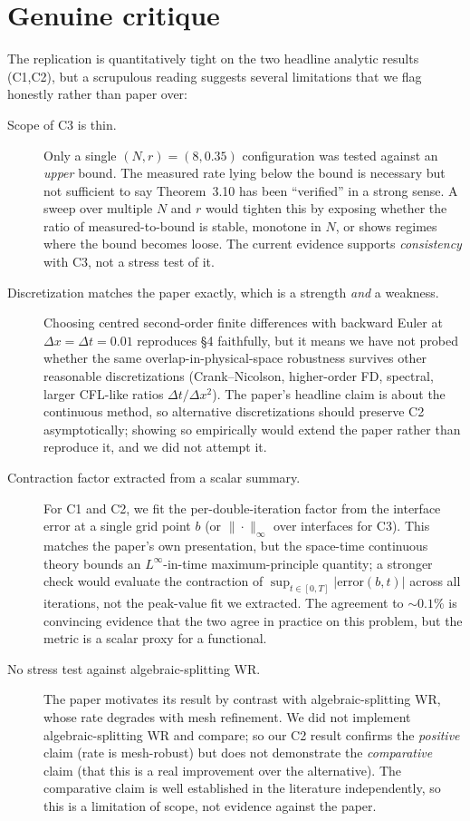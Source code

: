\documentclass[11pt]{article}
\begin{document}
\section{Genuine critique}
The replication is quantitatively tight on the two headline analytic results (C1,C2),
but a scrupulous reading suggests several limitations that we flag honestly rather than
paper over:

\begin{description}
\item[Scope of C3 is thin.]
Only a single $(N,r)=(8,0.35)$ configuration was tested against an \emph{upper} bound. The
measured rate lying below the bound is necessary but not sufficient to say Theorem~3.10 has
been ``verified'' in a strong sense. A sweep over multiple $N$ and $r$ would tighten this
by exposing whether the ratio of measured-to-bound is stable, monotone in $N$, or shows
regimes where the bound becomes loose. The current evidence supports \emph{consistency}
with C3, not a stress test of it.

\item[Discretization matches the paper exactly, which is a strength \emph{and} a weakness.]
Choosing centred second-order finite differences with backward Euler at
$\Delta x = \Delta t = 0.01$ reproduces \S 4 faithfully, but it means we have not probed
whether the same overlap-in-physical-space robustness survives other reasonable
discretizations (Crank--Nicolson, higher-order FD, spectral, larger CFL-like ratios
$\Delta t / \Delta x^2$). The paper's headline claim is about the continuous method, so
alternative discretizations should preserve C2 asymptotically; showing so empirically
would extend the paper rather than reproduce it, and we did not attempt it.

\item[Contraction factor extracted from a scalar summary.]
For C1 and C2, we fit the per-double-iteration factor from the interface error at a single
grid point $b$ (or $\|\cdot\|_\infty$ over interfaces for C3). This matches the paper's
own presentation, but the space-time continuous theory bounds an $L^\infty$-in-time
maximum-principle quantity; a stronger check would evaluate the contraction of
$\sup_{t\in[0,T]}|\text{error}(b,t)|$ across all iterations, not the peak-value fit we
extracted. The agreement to $\sim 0.1\%$ is convincing evidence that the two agree in
practice on this problem, but the metric is a scalar proxy for a functional.

\item[No stress test against algebraic-splitting WR.]
The paper motivates its result by contrast with algebraic-splitting WR, whose rate
degrades with mesh refinement. We did not implement algebraic-splitting WR and compare;
so our C2 result confirms the \emph{positive} claim (rate is mesh-robust) but does not
demonstrate the \emph{comparative} claim (that this is a real improvement over the
alternative). The comparative claim is well established in the literature independently,
so this is a limitation of scope, not evidence against the paper.


\end{description}
\end{document}
